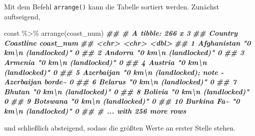 \documentclass[
  ngerman,
]{article}
\newenvironment{Shaded}{\begin{snugshade}}{\end{snugshade}}
\newcommand{\DocumentationTok}[1]{\textcolor[rgb]{0.56,0.35,0.01}{\textbf{\textit{#1}}}}
\newcommand{\FunctionTok}[1]{\textcolor[rgb]{0.00,0.00,0.00}{#1}}
\newcommand{\NormalTok}[1]{#1}
\newcommand{\SpecialCharTok}[1]{\textcolor[rgb]{0.00,0.00,0.00}{#1}}
\begin{document}
Mit dem Befehl \texttt{arrange()} kann die Tabelle sortiert werden. Zunächst auftseigend,

\begin{Shaded}
\begin{Highlighting}[]
\NormalTok{coast }\SpecialCharTok{\%\textgreater{}\%}
  \FunctionTok{arrange}\NormalTok{(coast\_num)}
\DocumentationTok{\#\# \# A tibble: 266 x 3}
\DocumentationTok{\#\#    Country     Coastline                                               coast\_num}
\DocumentationTok{\#\#    \textless{}chr\textgreater{}       \textless{}chr\textgreater{}                                                       \textless{}dbl\textgreater{}}
\DocumentationTok{\#\#  1 Afghanistan "0 km\textbackslash{}n          (landlocked)"                                  0}
\DocumentationTok{\#\#  2 Andorra     "0 km\textbackslash{}n          (landlocked)"                                  0}
\DocumentationTok{\#\#  3 Armenia     "0 km\textbackslash{}n          (landlocked)"                                  0}
\DocumentationTok{\#\#  4 Austria     "0 km\textbackslash{}n          (landlocked)"                                  0}
\DocumentationTok{\#\#  5 Azerbaijan  "0 km\textbackslash{}n          (landlocked); note {-} Azerbaijan borde\textasciitilde{}         0}
\DocumentationTok{\#\#  6 Belarus     "0 km\textbackslash{}n          (landlocked)"                                  0}
\DocumentationTok{\#\#  7 Bhutan      "0 km\textbackslash{}n          (landlocked)"                                  0}
\DocumentationTok{\#\#  8 Bolivia     "0 km\textbackslash{}n          (landlocked)"                                  0}
\DocumentationTok{\#\#  9 Botswana    "0 km\textbackslash{}n          (landlocked)"                                  0}
\DocumentationTok{\#\# 10 Burkina Fa\textasciitilde{} "0 km\textbackslash{}n          (landlocked)"                                  0}
\DocumentationTok{\#\# \# ... with 256 more rows}
\end{Highlighting}
\end{Shaded}

und schließlich absteigend, sodass die größten Werte an erster Stelle stehen.
\end{document}
